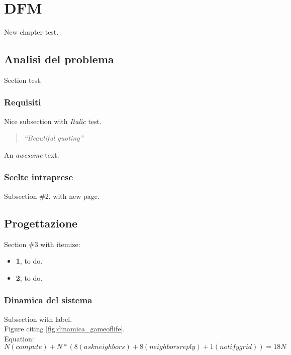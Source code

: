 \documentclass[12pt,a4paper,openright,oneside]{report}
\newcommand{\quotes}[1]{``#1''}
\begin{document}
	\clearpage{\pagestyle{empty}\cleardoublepage}
	\chapter{DFM}           %
	\lhead[\fancyplain{}{\bfseries\thepage}]{\fancyplain{}{\bfseries\rightmark}}
	New chapter test.
	\section{Analisi del problema}						%
	Section test.
	
	\subsection{Requisiti}
	\label{subsec:GameOfLifeRequisiti}
	Nice subsection with \textit{Italic} test.
	\begin{quote}
		\textit{\quotes{Beautiful quoting}}
	\end{quote}
	An \emph{awesome} text.
	
	\subsection{Scelte intraprese}
	Subsection \#2, with new page.
	\newpage
	\section{Progettazione}						%
	Section \#3 with itemize:
	\begin{itemize}
		\item \textbf{1}, to do.
		\item \textbf{2}, to do.
	\end{itemize}
	
	\subsection{Dinamica del sistema}
	\label{subsec:GameOfLifeDinamica}
	Subsection with label.\\
	Figure citing \ref{fig:dinamica_gameoflife}.\\
	Equation:
	\begin{equation}
	N (compute) + N * (8 (ask neighbors) + 8 (neighbors reply) + 1 (notify grid))
	= 18N
	\label{eq:NumeroMessaggiSoluzioneSemplice}
	\end{equation}
	
\end{document}
